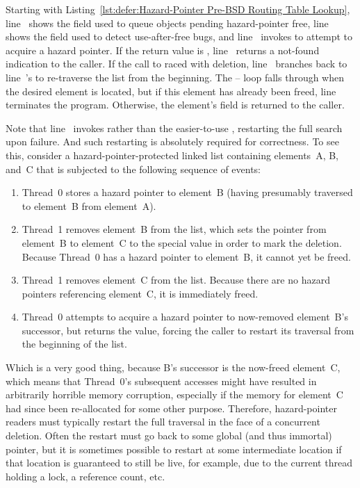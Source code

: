 \begin{fcvref}
Starting with
Listing~\ref{lst:defer:Hazard-Pointer Pre-BSD Routing Table Lookup},
line~ shows the  field used to queue objects pending
hazard-pointer free,
line~ shows the  field used to detect
use-after-free bugs, and line~ invokes
 to attempt to acquire a hazard pointer.
If the return value is , line~ returns a not-found
indication to the caller.
If the call to  raced with deletion, line~
branches back to line~'s  to re-traverse the list
from the beginning.
The -- loop falls through when the desired element is
located, but if this element has already been freed, line~
terminates the program.
Otherwise, the element's  field is returned to the caller.

Note that line~ invokes  rather
than the easier-to-use , restarting the full search
upon  failure.
And such restarting is absolutely required for correctness.  To see this,
consider a hazard-pointer-protected linked list containing elements~A,
B, and~C that is subjected to the following sequence of events:
\end{fcvref}

\begin{enumerate}
\item	Thread~0 stores a hazard pointer to element~B
	(having presumably traversed to element~B from element~A).
\item	Thread~1 removes element~B from the list, which sets
	the pointer from element~B to element~C to the special
	 value in order to mark the deletion.
	Because Thread~0 has a hazard pointer to element~B,
	it cannot yet be freed.
\item	Thread~1 removes element~C from the list.
	Because there are no hazard pointers referencing element~C,
	it is immediately freed.
\item	Thread~0 attempts to acquire a hazard pointer to now-removed
	element~B's successor, but  returns the
	 value, forcing the caller to restart its
	traversal from the beginning of the list.
\end{enumerate}

Which is a very good thing, because B's successor is the now-freed
element~C, which means that Thread~0's subsequent accesses might have
resulted in arbitrarily horrible memory corruption, especially if the
memory for element~C had since been re-allocated for some other purpose.
Therefore, hazard-pointer readers must typically restart the full
traversal in the face of a concurrent deletion.
Often the restart must go back to some global (and thus immortal) pointer,
but it is sometimes possible to restart at some intermediate location
if that location is guaranteed to still be live, for example, due to
the current thread holding a lock, a reference count, etc.

